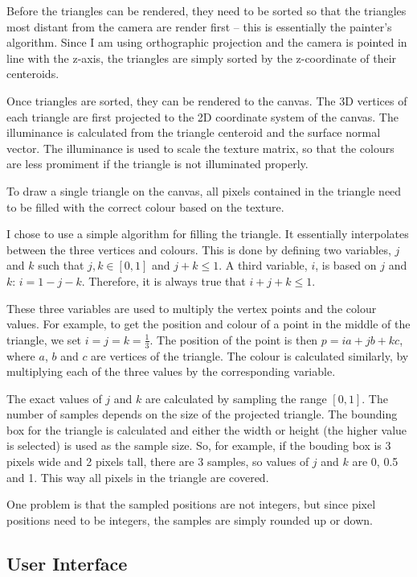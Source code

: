 \documentclass[]{article}
\begin{document}
Before the triangles can be rendered, they need to be sorted so that the triangles most distant from the camera are render first -- this is essentially the painter's algorithm. Since I am using orthographic projection and the camera is pointed in line with the z-axis, the triangles are simply sorted by the z-coordinate of their centeroids.

Once triangles are sorted, they can be rendered to the canvas. The 3D vertices of each triangle are first projected to the 2D coordinate system of the canvas. The illuminance is calculated from the triangle centeroid and the surface normal vector. The illuminance is used to scale the texture matrix, so that the colours are less promiment if the triangle is not illuminated properly.

To draw a single triangle on the canvas, all pixels contained in the triangle need to be filled with the correct colour based on the texture.

I chose to use a simple algorithm for filling the triangle. It essentially interpolates between the three vertices and colours. This is done by defining two variables, $j$ and $k$ such that $j, k \in [0, 1]$ and $j + k \leq 1$. A third variable, $i$, is based on $j$ and $k$: $i = 1 - j - k$. Therefore, it is always true that $i + j + k \leq 1$.

These three variables are used to multiply the vertex points and the colour values. For example, to get the position and colour of a point in the middle of the triangle, we set $i = j = k = \frac{1}{3}$. The position of the point is then $p = i a + j b + k c$, where $a$, $b$ and $c$ are vertices of the triangle. The colour is calculated similarly, by multiplying each of the three values by the corresponding variable.

The exact values of $j$ and $k$ are calculated by sampling the range $[0, 1]$. The number of samples depends on the size of the projected triangle. The bounding box for the triangle is calculated and either the width or height (the higher value is selected) is used as the sample size. So, for example, if the bouding box is 3 pixels wide and 2 pixels tall, there are 3 samples, so values of $j$ and $k$ are 0, 0.5 and 1. This way all pixels in the triangle are covered.

One problem is that the sampled positions are not integers, but since pixel positions need to be integers, the samples are simply rounded up or down.

\subsection{User Interface}
\end{document}
